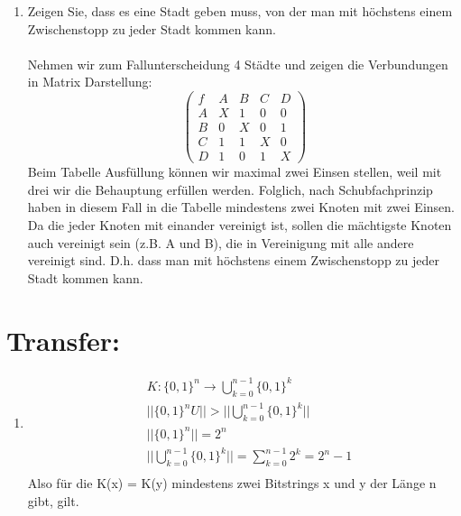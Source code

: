 \begin{enumerate}[label=(\alph*)]
		\newpage
		\item Zeigen Sie, dass es eine Stadt geben muss, von der man mit höchstens einem 
		Zwischenstopp zu jeder Stadt kommen kann.\\\\
		Nehmen wir zum Fallunterscheidung 4 St\"adte und zeigen die Verbundungen in Matrix Darstellung:\\
		\[\begin{pmatrix}
		  	f & A & B & C & D \\
		  	A & X & 1 & 0 & 0 \\
		  	B & 0 & X & 0 & 1\\
		  	C & 1 & 1 & X & 0\\
 			D & 1 & 0 & 1 & X
 		\end{pmatrix}\]
 		Beim Tabelle Ausf\"ullung k\"onnen wir maximal zwei Einsen stellen, weil mit drei wir 
 		die Behauptung erf\"ullen werden. Folglich, nach Schubfachprinzip haben in diesem Fall  in die Tabelle 
 		mindestens zwei Knoten mit zwei Einsen. Da die jeder Knoten mit einander vereinigt ist, sollen die m\"achtigste Knoten auch vereinigt sein (z.B. A und B), die in Vereinigung mit alle andere vereinigt sind. D.h. dass man
 		mit höchstens einem Zwischenstopp zu jeder Stadt kommen kann.

    \end{enumerate}
    \section*{Transfer:}
    \begin{enumerate}[label=(\alph*)]
    	\item 
    	\begin{align*}
    		&K:\{0,1\}^n \rightarrow \bigcup _{k=0}^{n-1} \{0,1\}^k \\
        	&||\{0,1\}^n U|| > || \bigcup _{k=0}^{n-1} \{0,1\}^k|| \\
        	&||\{0,1\}^n|| = 2^n \tag{Korollar 1.8}\\
        	&|| \bigcup _{k=0}^{n-1} \{0,1\}^k|| = \sum_{k=0}^{n-1}2^k=2^n-1 \tag{Theorem 1.20}\\
        \end{align*}
        Also für die K(x) = K(y) mindestens zwei Bitstrings x und y der Länge n gibt,  gilt.
    \end{enumerate}







